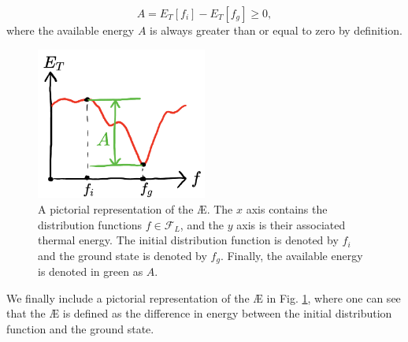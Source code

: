\begin{equation}
    A = E_T[f_i] - E_T[f_g] \geq 0,
\end{equation}
where the available energy $A$ is always greater than or equal to zero by definition.
\begin{figure}
    \centering
    \includegraphics[width=0.5\textwidth]{3_chapters/0_introduction/img/AE-def.pdf}
    \caption{A pictorial representation of the \AE{}. The $x$ axis contains the distribution functions $f \in \mathcal{F}_L$, and the $y$ axis is their associated thermal energy. The initial distribution function is denoted by $f_i$ and the ground state is denoted by $f_g$. Finally, the available energy is denoted in green as $A$.}
    \label{fig: ae def}
\end{figure}
We finally include a pictorial representation of the \AE{} in Fig. \ref{fig: ae def}, where one can see that the \AE{} is defined as the difference in energy between the initial distribution function and the ground state.
